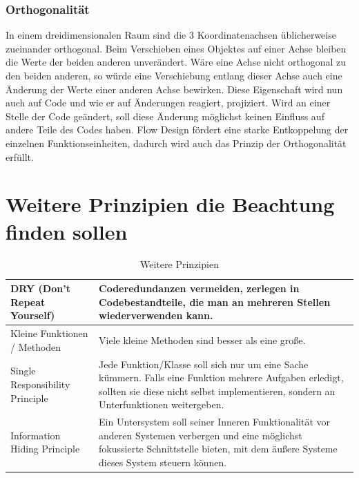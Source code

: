 \subsubsection{Orthogonalität}

In einem dreidimensionalen Raum sind die 3 Koordinatenachsen üblicherweise zueinander
orthogonal. Beim Verschieben eines Objektes auf einer Achse bleiben die Werte der
beiden anderen unverändert. Wäre eine Achse nicht orthogonal zu den beiden anderen,
so würde eine Verschiebung entlang dieser Achse auch eine Änderung der Werte
einer anderen Achse bewirken. Diese Eigenschaft wird nun auch auf Code und wie
er auf Änderungen reagiert, projiziert.
Wird an einer Stelle der Code geändert, soll diese Änderung möglichst keinen Einfluss auf
andere Teile des Codes haben. Flow Design fördert eine starke Entkoppelung der
einzelnen Funktionseinheiten, dadurch wird auch das Prinzip der
Orthogonalität erfüllt.


\section{Weitere Prinzipien die Beachtung finden sollen}

\bigskip
\begin{table}[H]
	\centering
\begin{tabularx}{\textwidth}{| p{160 pt} | X |}
	\hline
DRY  (Don't Repeat Yourself) \cite[S. 80 und S. 342]{Martin2009}  & Coderedundanzen vermeiden, zerlegen in Codebestandteile, die man an mehreren Stellen wiederverwenden kann. \\ \hline
Kleine Funktionen / Methoden {\cite[S. 64]{Martin2009}} & Viele kleine Methoden sind besser als eine große. \\ \hline
Single Responsibility Principle \cite[S. 176 f.]{Martin2009} & Jede Funktion/Klasse soll sich nur um eine Sache kümmern. Falls eine Funktion mehrere 
Aufgaben erledigt, sollten sie diese nicht selbst implementieren, sondern an Unterfunktionen weitergeben. \\ \hline
Information Hiding Principle \cite[S. 48 f.]{schummelzettel}  & Ein Untersystem soll seiner Inneren Funktionalität vor anderen Systemen verbergen und eine möglichst fokussierte Schnittstelle bieten, mit dem äußere Systeme dieses System steuern können.\\ \hline
	\end{tabularx}
	\medskip
	\caption{Weitere Prinzipien}
\end{table}

